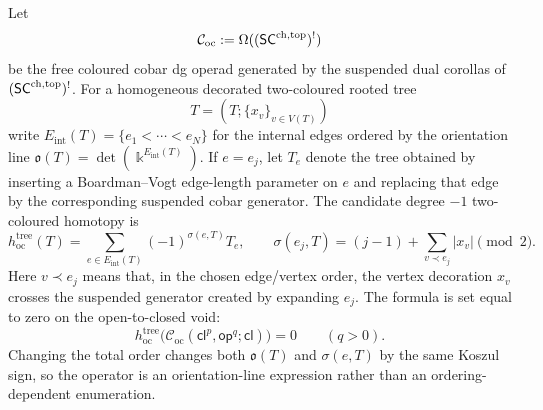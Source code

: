 \begin{definition}%
\label{def:chd-two-coloured-cobar-tree-homotopy}%
%
Let
\[
 \mathcal C_{\mathrm{oc}}:=\Omega((\mathsf{SC}^{\mathrm{ch},\mathrm{top}})^!)
\]
be the free coloured cobar dg operad generated by the suspended
dual corollas of \((\mathsf{SC}^{\mathrm{ch},\mathrm{top}})^!\). For a homogeneous decorated
two-coloured rooted tree
\[
 T=(T;\{x_v\}_{v\in V(T)})
\]
write \(E_{\mathrm{int}}(T)=\{e_1<\cdots<e_N\}\) for the internal
edges ordered by the orientation line
\(\mathfrak{o}(T)=\det(\Bbbk^{E_{\mathrm{int}}(T)})\). If \(e=e_j\),
let \(T_e\) denote the tree obtained by inserting a
Boardman--Vogt edge-length parameter on \(e\) and replacing that edge
by the corresponding suspended cobar generator. The candidate
degree \(-1\) two-coloured homotopy is
\begin{equation}\label{eq:chd-hoc-tree-formula}
 h_{\mathrm{oc}}^{\mathrm{tree}}(T)
 =
 \sum_{e\in E_{\mathrm{int}}(T)}
 (-1)^{\sigma(e,T)}T_e,
 \qquad
 \sigma(e_j,T)
 =
 (j-1)+\sum_{v\prec e_j}|x_v|\pmod 2.
\end{equation}
Here \(v\prec e_j\) means that, in the chosen edge/vertex order,
the vertex decoration \(x_v\) crosses the suspended generator created
by expanding \(e_j\). The formula is set equal to zero on the
open-to-closed void:
\[
 h_{\mathrm{oc}}^{\mathrm{tree}}\bigl(
 \mathcal C_{\mathrm{oc}}(\mathsf{cl}^{p},\mathsf{op}^{q};\mathsf{cl})
 \bigr)=0\qquad(q>0).
\]
Changing the total order changes both \(\mathfrak{o}(T)\) and
\(\sigma(e,T)\) by the same Koszul sign, so the operator is an
orientation-line expression rather than an ordering-dependent
enumeration.
\end{definition}

